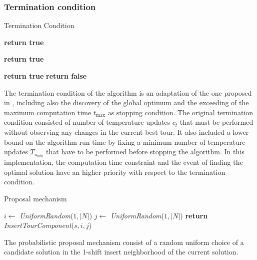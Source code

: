 \begin{homeworkProblem}
\subsubsection{Termination condition}
\begin{algorithm}[!h]
  \caption{Termination Condition}\label{SA:Term}
  \begin{algorithmic}[1]
				      \State \textbf{return true}
			 \EndIf
			  
				      \State \textbf{return true}
			  \EndIf
       
				      \State \textbf{return true}
			      \EndIf
			\Else    
        \State \textbf{return false}
      \EndIf
    \EndProcedure
\end{algorithmic}
\end{algorithm}

The termination condition of the algorithm is an adaptation of the one proposed in \cite{ohlmann2007compressed}, including also the discovery of the global optimum and the exceeding of the maximum computation time $t_{\max}$ as stopping condition.
The original termination condition consisted of number of temperature updates $c_t$ that must be performed without observing any changes in the current best tour.
It also included a lower bound on the algorithm run-time by fixing a minimum number of temperature updates $T_{u_{\min}}$ that have to be performed before stopping the algorithm.
In this implementation, the computation time constraint and the event of finding the optimal solution have an higher priority with respect to the termination condition.

\begin{algorithm}
\caption{Proposal mechanism}
\label{SA:Prop}
\begin{algorithmic}
  \State $i \gets $ \emph{UniformRandom}($1,|N|$)
    \State $j \gets $ \emph{UniformRandom}($1,|N|$)
  \EndWhile  
  \State \textbf{return} \emph{InsertTourComponent}($s,i,j$)   
\EndProcedure
\end{algorithmic}
\end{algorithm}

The probabilistic proposal mechanism consist of a random uniform choice of a candidate solution in the 1-shift insert neighborhood of the current solution.


\end{homeworkProblem}

